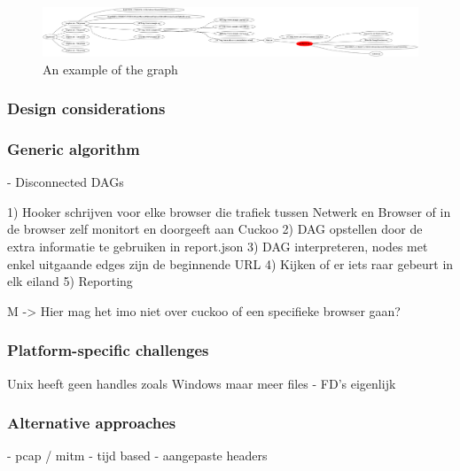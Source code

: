 \begin{figure}[h]
    \centering
    \includegraphics[width=17cm]{Images/alg_tree.png}
    \caption{An example of the graph}
    \label{fig:alg_tree}
\end{figure}

\subsubsection{Design considerations}

\subsubsection{Generic algorithm}

- Disconnected DAGs

1) Hooker schrijven voor elke browser die trafiek tussen Netwerk en Browser of in de browser zelf monitort en doorgeeft aan Cuckoo
2) DAG opstellen door de extra informatie te gebruiken in report.json
3) DAG interpreteren, nodes met enkel uitgaande edges zijn de beginnende URL
4) Kijken of er iets raar gebeurt in elk eiland
5) Reporting

M -> Hier mag het imo niet over cuckoo of een specifieke browser gaan?

\subsubsection{Platform-specific challenges}

Unix heeft geen handles zoals Windows maar meer files
	- FD's eigenlijk

\subsubsection{Alternative approaches}

- pcap / mitm
- tijd based
- aangepaste headers